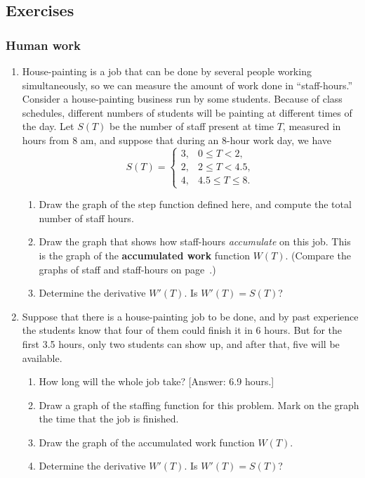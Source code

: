 \subsection{Exercises}
\label{subsec:exercises}

\subsubsection{Human work}
\label{subsubsec:human-work}



\begin{enumerate}
\item House-painting is a job that can be done by several people working simultaneously, so we can measure the amount of work done in ``staff-hours.''  Consider a house-painting business run by some students.  Because of class schedules, different numbers of students will be painting at different times of the day.  Let $S(T)$ be the number of staff present at time $T$, measured in hours from 8 am, and suppose that during an 8-hour work day, we have
\[
S(T) = \begin{cases} 
3, & 0 \le T < 2, \\ 
2, & 2 \le T < 4.5, \\
4, & 4.5 \le T \le 8.
\end{cases}
\]


  \begin{enumerate}
  \item Draw the graph of the step function defined here, and compute the total number of staff hours.

  \item Draw the graph that shows how staff-hours {\em accumulate\/} on this job.  This is the graph of the {\bf accumulated work} function $W(T)$.  (Compare the graphs of staff and staff-hours on page~\pageref{staffgraph}.)


  \item Determine the derivative $W'(T)$.  Is $W'(T) = S(T)$?


\end{enumerate}
\item Suppose that there is a house-painting job to be done, and by past experience the students know that four of them could finish it in 6 hours.  But for the first 3.5 hours, only two students can show up, and after that, five will be available.

  \begin{enumerate}
  \item How long will the whole job take?  \hfill [Answer: 6.9 hours.]


  \item Draw a graph of the staffing function for this problem.  Mark on the graph the time that the job is finished.

  \item Draw the graph of the accumulated work function $W(T)$.

  \item Determine the derivative $W'(T)$.  Is $W'(T) = S(T)$?



  \end{enumerate}
\end{enumerate}
